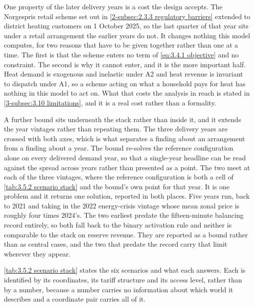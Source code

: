 One property of the later delivery years is a cost the design accepts. The Norgespris retail scheme set out in \autoref{2-subsec:2.3.3 regulatory barriers} extended to district heating customers on 1 October 2025, so the last quarter of that year sits under a retail arrangement the earlier years do not. It changes nothing this model computes, for two reasons that have to be given together rather than one at a time. The first is that the scheme enters no term of \autoref{eq:3.4.1 objective} and no constraint. The second is why it cannot enter, and it is the more important half. Heat demand is exogenous and inelastic under A2 and heat revenue is invariant to dispatch under A1, so a scheme acting on what a household pays for heat has nothing in this model to act on. What that costs the analysis in reach is stated in \autoref{3-subsec:3.10 limitations}, and it is a real cost rather than a formality.

A further bound sits underneath the stack rather than inside it, and it extends the year vintages rather than repeating them. The three delivery years are crossed with both axes, which is what separates a finding about an arrangement from a finding about a year. The bound re-solves the reference configuration alone on every delivered demand year, so that a single-year headline can be read against the spread across years rather than presented as a point. The two meet at each of the three vintages, where the reference configuration is both a cell of \autoref{tab:3.5.2 scenario stack} and the bound's own point for that year. It is one problem and it returns one solution, reported in both places. Five years run, back to 2021 and taking in the 2022 energy-crisis vintage whose mean zonal price is roughly four times 2024's. The two earliest predate the fifteen-minute balancing record entirely, so both fall back to the binary activation rule and neither is comparable to the stack on reserve revenue. They are reported as a bound rather than as central cases, and the two that predate the record carry that limit wherever they appear.

\autoref{tab:3.5.2 scenario stack} states the six scenarios and what each answers. Each is identified by its coordinates, its tariff structure and its access level, rather than by a number, because a number carries no information about which world it describes and a coordinate pair carries all of it.

